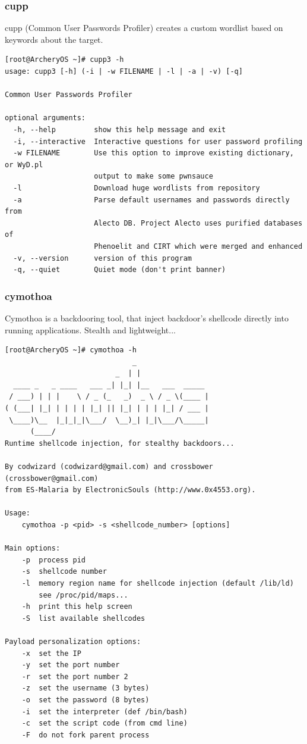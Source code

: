 \documentclass{article}
\begin{document}
\subsubsection{cupp}
cupp (Common User Passwords Profiler) creates a custom wordlist based on keywords about the target.
\begin{lstlisting}
[root@ArcheryOS ~]# cupp3 -h
usage: cupp3 [-h] (-i | -w FILENAME | -l | -a | -v) [-q]

Common User Passwords Profiler

optional arguments:
  -h, --help         show this help message and exit
  -i, --interactive  Interactive questions for user password profiling
  -w FILENAME        Use this option to improve existing dictionary, or WyD.pl
                     output to make some pwnsauce
  -l                 Download huge wordlists from repository
  -a                 Parse default usernames and passwords directly from
                     Alecto DB. Project Alecto uses purified databases of
                     Phenoelit and CIRT which were merged and enhanced
  -v, --version      version of this program
  -q, --quiet        Quiet mode (don't print banner)
\end{lstlisting}

\subsubsection{cymothoa}
Cymothoa is a backdooring tool, that inject backdoor's shellcode directly into running applications. Stealth and lightweight...
\begin{lstlisting}
[root@ArcheryOS ~]# cymothoa -h
                              _                 
                          _  | |                
  ____ _   _ ____   ___ _| |_| |__   ___  _____ 
 / ___) | | |    \ / _ (_   _)  _ \ / _ \(____ |
( (___| |_| | | | | |_| || |_| | | | |_| / ___ |
 \____)\__  |_|_|_|\___/  \__)_| |_|\___/\_____|
      (____/  
Runtime shellcode injection, for stealthy backdoors...

By codwizard (codwizard@gmail.com) and crossbower (crossbower@gmail.com)
from ES-Malaria by ElectronicSouls (http://www.0x4553.org).

Usage:
	cymothoa -p <pid> -s <shellcode_number> [options]

Main options:
	-p	process pid
	-s	shellcode number
	-l	memory region name for shellcode injection (default /lib/ld)
	  	see /proc/pid/maps...
	-h	print this help screen
	-S	list available shellcodes

Payload personalization options:
	-x	set the IP
	-y	set the port number
	-r	set the port number 2
	-z	set the username (3 bytes)
	-o	set the password (8 bytes)
	-i	set the interpreter (def /bin/bash)
	-c	set the script code (from cmd line)
	-F	do not fork parent process
\end{lstlisting}
\end{document}
